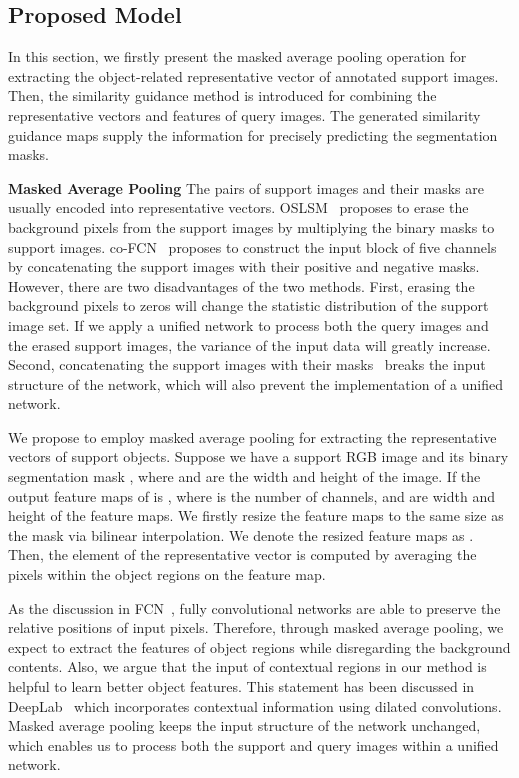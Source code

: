\documentclass[journal]{IEEEtran}
\begin{document}
\subsection{Proposed Model}\label{model}
In this section, we firstly present the masked average pooling operation for extracting the object-related representative vector of annotated support images.
Then, the similarity guidance method is introduced for combining the representative vectors and features of query images. 
The generated similarity guidance maps supply the information for precisely predicting the segmentation masks.

\noindent \textbf{Masked Average Pooling}
The pairs of support images and their masks are usually encoded into representative vectors.
OSLSM~\cite{shaban2017one} proposes to erase the background pixels from the support images by multiplying the binary masks to support images.
co-FCN~\cite{rakelly2018conditional} proposes to construct the input block of five channels by concatenating the support images with their positive and negative masks.
However, there are two disadvantages of the two methods. 
First, erasing the background pixels to zeros will change the statistic distribution of the support image set.
If we apply a unified network to process both the query images and the erased support images, the variance of the input data will greatly increase.
Second, concatenating the support images with their masks~\cite{rakelly2018conditional} breaks the input structure of the network, which will also prevent the implementation of a unified network.

We propose to employ masked average pooling for extracting the representative vectors of support objects.
Suppose we have a support RGB image  and its binary segmentation mask , where  and  are the width and height of the image.
If the output feature maps of  is , where  is the number of channels,  and  are width and height of the feature maps.
We firstly resize the feature maps to the same size as the mask  via bilinear interpolation.
We denote the resized feature maps as .
Then, the  element  of the representative vector  is computed by averaging the pixels within the object regions on the  feature map.

As the discussion in FCN~\cite{2015-long}, fully convolutional networks are able to preserve the relative positions of input pixels.
Therefore, through masked average pooling, we expect to extract the features of object regions while disregarding the background contents.
Also, we argue that the input of contextual regions in our method is helpful to learn better object features.
This statement has been discussed in DeepLab~\cite{chen2014semantic} which incorporates contextual information using dilated convolutions.
Masked average pooling keeps the input structure of the network unchanged, which enables us to process both the support and query images within a unified network.
\end{document}
